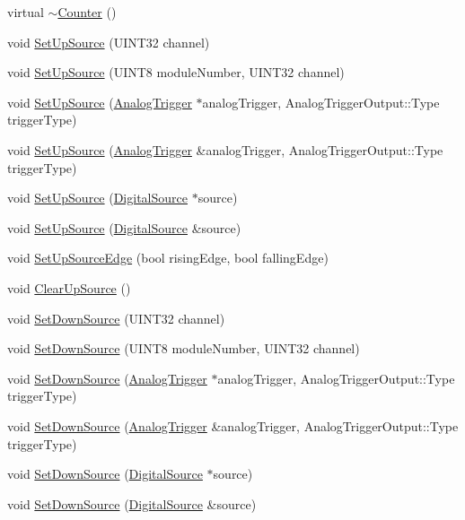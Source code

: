 \begin{DoxyCompactItemize}
\item 
virtual \hyperlink{classCounter_a97f4728470ae8eff37d50ef1d6bb0135}{$\sim$Counter} ()
\item 
void \hyperlink{classCounter_a2788b50d591e9b9058bc7250268ced5d}{SetUpSource} (UINT32 channel)
\item 
void \hyperlink{classCounter_a8f08109b27bb842c67826c27354fb68b}{SetUpSource} (UINT8 moduleNumber, UINT32 channel)
\item 
void \hyperlink{classCounter_a8e9838e4f44bf8111356ecdbbab833d9}{SetUpSource} (\hyperlink{classAnalogTrigger}{AnalogTrigger} $\ast$analogTrigger, AnalogTriggerOutput::Type triggerType)
\item 
void \hyperlink{classCounter_a8cddeb27c997a2cd5e7372367b6d8ced}{SetUpSource} (\hyperlink{classAnalogTrigger}{AnalogTrigger} \&analogTrigger, AnalogTriggerOutput::Type triggerType)
\item 
void \hyperlink{classCounter_a0687b78f7bf8a269d653eddca1819d5d}{SetUpSource} (\hyperlink{classDigitalSource}{DigitalSource} $\ast$source)
\item 
void \hyperlink{classCounter_a0015c2da61df6011bfbaf20bbf62982d}{SetUpSource} (\hyperlink{classDigitalSource}{DigitalSource} \&source)
\item 
void \hyperlink{classCounter_af75f91bb8b014b04585b5bebb102e65d}{SetUpSourceEdge} (bool risingEdge, bool fallingEdge)
\item 
void \hyperlink{classCounter_adfbbfef3d5b90d61d2a3702c3876e599}{ClearUpSource} ()
\item 
void \hyperlink{classCounter_a61624bde53b714db868b422ad1e35813}{SetDownSource} (UINT32 channel)
\item 
void \hyperlink{classCounter_a683e70937992ac5830e268274b64429c}{SetDownSource} (UINT8 moduleNumber, UINT32 channel)
\item 
void \hyperlink{classCounter_a672fefa4c325665617f38e6588d83541}{SetDownSource} (\hyperlink{classAnalogTrigger}{AnalogTrigger} $\ast$analogTrigger, AnalogTriggerOutput::Type triggerType)
\item 
void \hyperlink{classCounter_a74064fcd79b179aaf782d4ae8e7bd42e}{SetDownSource} (\hyperlink{classAnalogTrigger}{AnalogTrigger} \&analogTrigger, AnalogTriggerOutput::Type triggerType)
\item 
void \hyperlink{classCounter_a667ea67a66e39b5ce6727f49253bae02}{SetDownSource} (\hyperlink{classDigitalSource}{DigitalSource} $\ast$source)
\item 
void \hyperlink{classCounter_a68fa4169dd3cf9a0c58de786f2d69c76}{SetDownSource} (\hyperlink{classDigitalSource}{DigitalSource} \&source)

\end{DoxyCompactItemize}
